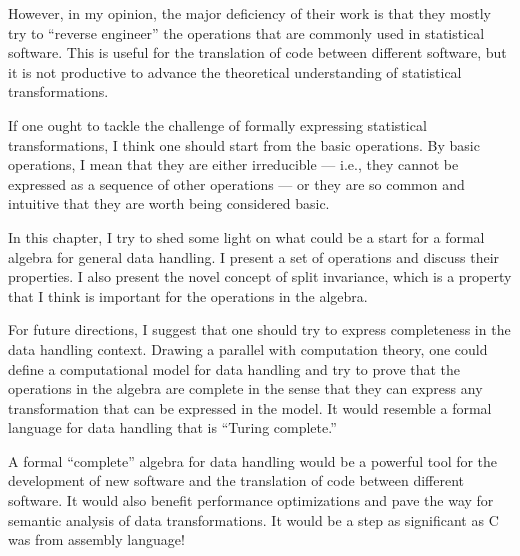 However, in my opinion, the major deficiency of their work is that they mostly try to
``reverse engineer'' the operations that are commonly used in statistical software.  This
is useful for the translation of code between different software, but it is not productive
to advance the theoretical understanding of statistical transformations.

If one ought to tackle the challenge of formally expressing statistical transformations, I
think one should start from the basic operations.  By basic operations, I mean that they
are either irreducible --- i.e., they cannot be expressed as a sequence of other
operations --- or they are so common and intuitive that they are worth being considered
basic.

In this chapter, I try to shed some light on what could be a start for a formal algebra
for general data handling.  I present a set of operations and discuss their properties. I
also present the novel concept of split invariance, which is a property that I think is
important for the operations in the algebra.

For future directions, I suggest that one should try to express completeness in the data
handling context.  Drawing a parallel with computation theory, one could define a
computational model for data handling and try to prove that the operations in the algebra
are complete in the sense that they can express any transformation that can be expressed
in the model.  It would resemble a formal language for data handling that is ``Turing
complete.''

A formal ``complete'' algebra for data handling would be a powerful tool for the
development of new software and the translation of code between different software.  It
would also benefit performance optimizations and pave the way for semantic analysis of
data transformations.  It would be a step as significant as C was from assembly language!

